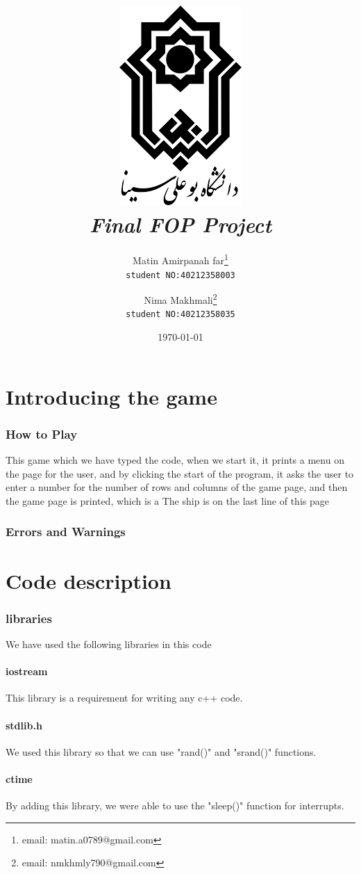 \documentclass[12pt,a4paper]{article}
\title{\includegraphics[scale=0.5]{Graphics/BASU_Logo_header.png}\\[20pt] {\Huge \emph{Final FOP Project}}}
\author{Matin Amirpanah far\thanks{email: matin.a0789@gmail.com}\\
	\texttt{student NO:40212358003}\and
	Nima Makhmali\thanks{email: nmkhmly790@gmail.com}\\ \texttt{student NO:40212358035}}
\date{\today}
\begin{document}
	
	\maketitle
	
	\newpage
	\tableofcontents
	
	\newpage
	\setcounter{section}{0}
	\part{Introducing the game}\label{introducing}
        	
	\section{How to Play}\label{introducing.how}
	  This game which we have typed the code, when we start it, it prints a menu on the page for the user, and by clicking the start of the program, it asks the user to enter a number for the number of rows and columns of the game page, and then the game page is printed, which is a The ship is on the last line of this page
	\section{Errors and Warnings}\label{introducing.errors}
	
	
	\newpage
	\setcounter{section}{0}
	\part{Code description}\label{description}
	
	\section{libraries}\label{description.libraries}
	We have used the following libraries in this code
	\subsection{iostream}
	This library is a requirement for writing any c++ code.
	\subsection{stdlib.h}
	We used this library so that we can use "rand()" and "srand()" functions.
	\subsection{ctime}
	By adding this library, we were able to use the "sleep()" function for interrupts.
\end{document}
